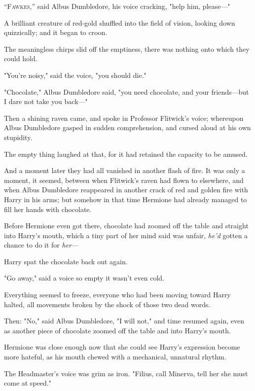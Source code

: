 
\lettrine{“F}{awkes},'' said
Albus Dumbledore, his voice cracking, "help him, please—"

A brilliant creature of red-gold shuffled into the field of vision, looking
down quizzically; and it began to croon.

The meaningless chirps slid off the emptiness, there was nothing onto which
they could hold.

"You're noisy," said the voice, "you should die."

"Chocolate," Albus Dumbledore said, "you need chocolate, and your friends—but
I dare not take you back—"

Then a shining raven came, and spoke in Professor Flitwick's voice; whereupon
Albus Dumbledore gasped in sudden comprehension, and cursed aloud at his own
stupidity.

The empty thing laughed at that, for it had retained the capacity to be amused.

And a moment later they had all vanished in another flash of fire.
\sbreak
It was only a moment, it seemed, between when Flitwick's raven had flown to
elsewhere, and when Albus Dumbledore reappeared in another crack of red and
golden fire with Harry in his arms; but somehow in that time Hermione had
already managed to fill her hands with chocolate.

Before Hermione even got there, chocolate had zoomed off the table and straight
into Harry's mouth, which a tiny part of her mind said was unfair, \emph{he'd}
gotten a chance to do it for \emph{her—}

Harry spat the chocolate back out again.

"Go away," said a voice so empty it wasn't even cold.

{\el}

Everything seemed to freeze, everyone who had been moving toward Harry halted,
all movements broken by the shock of those two dead words.

Then: "No," said Albus Dumbledore, "I will not," and time resumed again, even
as another piece of chocolate zoomed off the table and into Harry's mouth.

Hermione was close enough now that she could see Harry's expression become more
hateful, as his mouth chewed with a mechanical, unnatural rhythm.

The Headmaster's voice was grim as iron. "Filius, call Minerva, tell her she
must come at speed."

